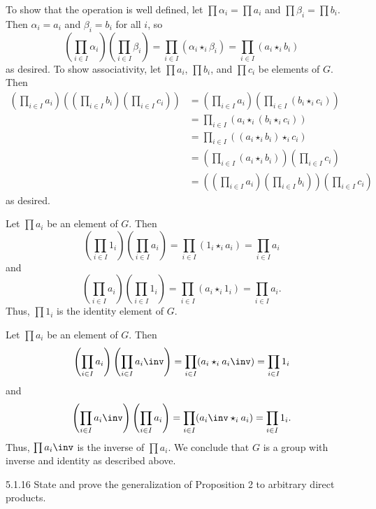 \begin{solenum}
    \item To show that the operation is well defined, let $\prod \alpha_i = \prod a_i$ and $\prod \beta_i = \prod b_i$.
	Then $\alpha_i = a_i$ and $\beta_i = b_i$ for all $i$, so
    \[
    	\left(\prod_{i \in I} \alpha_i\right)\left(\prod_{i \in I} \beta_i\right) = \prod_{i \in I} (\alpha_i \star_i \beta_i) = \prod_{i \in I} (a_i \star_i b_i)
    \]
    as desired.
	To show associativity, let $\prod a_i$, $\prod b_i$, and $\prod c_i$ be elements of $G$.
	Then
    \begin{align*}
        \left(\prod_{i \in I} a_i\right)\left(\left(\prod_{i \in I} b_i\right)\left(\prod_{i \in I} c_i\right)\right) & = \left(\prod_{i \in I} a_i\right)\left(\prod_{i \in I} (b_i \star_i c_i)\right) \\
        & = \prod_{i \in I} (a_i \star_i (b_i \star_i c_i)) \\
        & = \prod_{i \in I} ((a_i \star_i b_i) \star_i c_i) \\
        & = \left(\prod_{i \in I} (a_i \star_i b_i)\right)\left(\prod_{i \in I} c_i\right) \\
        & = \left(\left(\prod_{i \in I} a_i\right)\left(\prod_{i \in I} b_i\right)\right)\left(\prod_{i \in I} c_i\right)
    \end{align*}
    as desired.
    \item Let $\prod a_i$ be an element of $G$.
	Then
    \[
    	\left(\prod_{i \in I} 1_i\right)\left(\prod_{i \in I} a_i\right) = \prod_{i \in I} (1_i \star_i a_i) = \prod_{i \in I} a_i
    \]
    and
    \[
    	\left(\prod_{i \in I} a_i\right)\left(\prod_{i \in I} 1_i\right) = \prod_{i \in I} (a_i \star_i 1_i) = \prod_{i \in I} a_i.
    \]
    Thus, $\prod 1_i$ is the identity element of $G$.
    \item Let $\prod a_i$ be an element of $G$.
	Then
    \[
    	\left(\prod_{i \in I} a_i\right)\left(\prod_{i \in I} a_i\inv\right) = \prod_{i \in I} (a_i \star_i a_i\inv) = \prod_{i \in I} 1_i
    \]
    and
    \[
    	\left(\prod_{i \in I} a_i\inv\right)\left(\prod_{i \in I} a_i\right) = \prod_{i \in I} (a_i\inv \star_i a_i) = \prod_{i \in I} 1_i.
    \]
    Thus, $\prod a_i\inv$ is the inverse of $\prod a_i$.
	We conclude that $G$ is a group with inverse and identity as described above.
\end{solenum}

\begin{exercise}{5.1.16}
    State and prove the generalization of Proposition 2 to arbitrary direct products.
\end{exercise}

